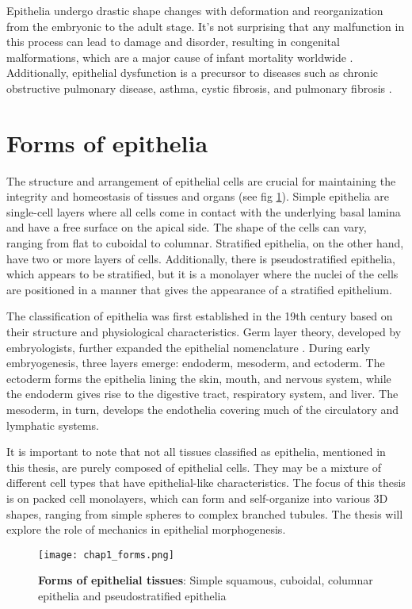 Epithelia undergo drastic shape changes with deformation and reorganization from the embryonic to the adult stage. It's not surprising that any malfunction in this process can lead to damage and disorder, resulting in congenital malformations, which are a major cause of infant mortality worldwide \cite{clarke2021}. Additionally, epithelial dysfunction is a precursor to diseases such as chronic obstructive pulmonary disease, asthma, cystic fibrosis, and pulmonary fibrosis \cite{carlier2021}.

\hypertarget{forms-of-epithelia}{%
	\section{Forms of epithelia}\label{forms-of-epithelia}}

The structure and arrangement of epithelial cells are crucial for maintaining the integrity and homeostasis of tissues and organs (see fig \ref{fig_1_5}). Simple epithelia are single-cell layers where all cells come in contact with the underlying basal lamina and have a free surface on the apical side. The shape of the cells can vary, ranging from flat to cuboidal to columnar. Stratified epithelia, on the other hand, have two or more layers of cells. Additionally, there is pseudostratified epithelia, which appears to be stratified, but it is a monolayer where the nuclei of the cells are positioned in a manner that gives the appearance of a stratified epithelium.

The classification of epithelia was first established in the 19th century based on their structure and physiological characteristics. Germ layer theory, developed by embryologists, further expanded the epithelial nomenclature \cite{maccord2012}. During early embryogenesis, three layers emerge: endoderm, mesoderm, and ectoderm. The ectoderm forms the epithelia lining the skin, mouth, and nervous system, while the endoderm gives rise to the digestive tract, respiratory system, and liver. The mesoderm, in turn, develops the endothelia covering much of the circulatory and lymphatic systems.

It is important to note that not all tissues classified as epithelia, mentioned in this thesis, are purely composed of epithelial cells. They may be a mixture of different cell types that have epithelial-like characteristics. The focus of this thesis is on packed cell monolayers, which can form and self-organize into various 3D shapes, ranging from simple spheres to complex branched tubules. The thesis will explore the role of mechanics in epithelial morphogenesis.

\begin{figure}[H]
	\centering
	\texttt{[image: chap1\_forms.png]}
	\caption{\label{fig_1_5} \textbf{Forms of epithelial tissues}: Simple squamous, cuboidal, columnar epithelia and pseudostratified epithelia}
\end{figure}